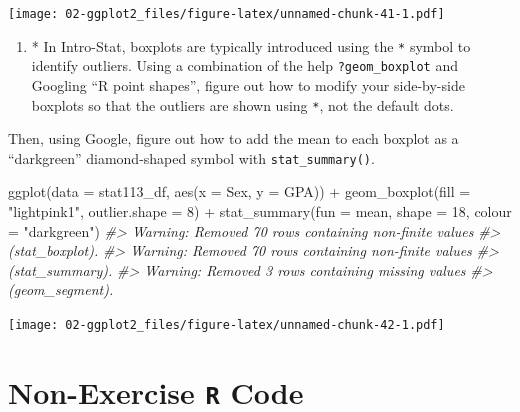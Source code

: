 \documentclass[
]{book}
\newenvironment{Shaded}{\begin{snugshade}}{\end{snugshade}}
\newcommand{\AttributeTok}[1]{\textcolor[rgb]{0.77,0.63,0.00}{#1}}
\newcommand{\CommentTok}[1]{\textcolor[rgb]{0.56,0.35,0.01}{\textit{#1}}}
\newcommand{\DecValTok}[1]{\textcolor[rgb]{0.00,0.00,0.81}{#1}}
\newcommand{\FunctionTok}[1]{\textcolor[rgb]{0.00,0.00,0.00}{#1}}
\newcommand{\NormalTok}[1]{#1}
\newcommand{\SpecialCharTok}[1]{\textcolor[rgb]{0.00,0.00,0.00}{#1}}
\newcommand{\StringTok}[1]{\textcolor[rgb]{0.31,0.60,0.02}{#1}}
\providecommand{\tightlist}{%
  \setlength{\itemsep}{0pt}\setlength{\parskip}{0pt}}
\begin{document}
\texttt{[image: 02-ggplot2\_files/figure-latex/unnamed-chunk-41-1.pdf]}

\begin{enumerate}
\def\labelenumi{\arabic{enumi}.}
\setcounter{enumi}{2}
\tightlist
\item
  * In Intro-Stat, boxplots are typically introduced using the \texttt{*} symbol to identify outliers. Using a combination of the help \texttt{?geom\_boxplot} and Googling ``R point shapes'', figure out how to modify your side-by-side boxplots so that the outliers are shown using \texttt{*}, not the default dots.
\end{enumerate}

Then, using Google, figure out how to add the mean to each boxplot as a ``darkgreen'' diamond-shaped symbol with \texttt{stat\_summary()}.

\begin{Shaded}
\begin{Highlighting}[]
\FunctionTok{ggplot}\NormalTok{(}\AttributeTok{data =}\NormalTok{ stat113\_df, }\FunctionTok{aes}\NormalTok{(}\AttributeTok{x =}\NormalTok{ Sex, }\AttributeTok{y =}\NormalTok{ GPA)) }\SpecialCharTok{+}
  \FunctionTok{geom\_boxplot}\NormalTok{(}\AttributeTok{fill =} \StringTok{"lightpink1"}\NormalTok{, }\AttributeTok{outlier.shape =} \DecValTok{8}\NormalTok{) }\SpecialCharTok{+}
  \FunctionTok{stat\_summary}\NormalTok{(}\AttributeTok{fun =}\NormalTok{ mean, }\AttributeTok{shape =} \DecValTok{18}\NormalTok{, }\AttributeTok{colour =} \StringTok{"darkgreen"}\NormalTok{)}
\CommentTok{\#\textgreater{} Warning: Removed 70 rows containing non{-}finite values}
\CommentTok{\#\textgreater{} (stat\_boxplot).}
\CommentTok{\#\textgreater{} Warning: Removed 70 rows containing non{-}finite values}
\CommentTok{\#\textgreater{} (stat\_summary).}
\CommentTok{\#\textgreater{} Warning: Removed 3 rows containing missing values}
\CommentTok{\#\textgreater{} (geom\_segment).}
\end{Highlighting}
\end{Shaded}

\texttt{[image: 02-ggplot2\_files/figure-latex/unnamed-chunk-42-1.pdf]}

\hypertarget{rcode-2}{%
\section{\texorpdfstring{Non-Exercise \texttt{R} Code}{Non-Exercise R Code}}\label{rcode-2}}
\end{document}
